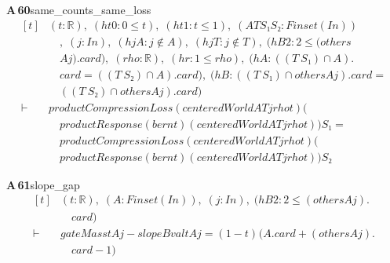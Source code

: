 \documentclass[conference]{IEEEtran}
\theoremstyle{definition}
\newcommand{\lean}[1]{\textsf{\footnotesize #1}}
\begin{document}
\noindent\textbf{A\,60}\quad\lean{same\_counts\_same\_loss}
{\footnotesize\[ \begin{aligned}[t]
&(\mathit{t} : \mathbb{R} ),\; (\mathit{ht0} : 0 \leq \mathit{t}),\; (\mathit{ht1} : \mathit{t} \leq 1),\; (\mathit{A} \mathit{T} \mathit{S₁} \mathit{S₂} : \mathit{Finset} (\mathit{I} \mathit{n}))\\
&\quad ,\; (\mathit{j} : \mathit{I} \mathit{n}),\; (\mathit{hjA} : \mathit{j} \notin \mathit{A}),\; (\mathit{hjT} : \mathit{j} \notin \mathit{T}),\; (\mathit{hB2} : 2 \leq (\mathit{others}\\
&\quad \mathit{A} \mathit{j}).\mathit{card}),\; (\mathit{rho} : \mathbb{R} ),\; (\mathit{hr} : 1 \leq \mathit{rho}),\; (\mathit{hA} : ((\mathit{T} \ \mathit{S₁}) \cap \mathit{A}).\\
&\quad \mathit{card} = ((\mathit{T} \ \mathit{S₂}) \cap \mathit{A}).\mathit{card}),\; (\mathit{hB} : ((\mathit{T} \ \mathit{S₁}) \cap \mathit{others} \mathit{A} \mathit{j}).\mathit{card} =\\
&\quad ((\mathit{T} \ \mathit{S₂}) \cap \mathit{others} \mathit{A} \mathit{j}).\mathit{card})\\
\vdash\;&\mathit{productCompressionLoss} (\mathit{centeredWorld} \mathit{A} \mathit{T} \mathit{j} \mathit{rho} \mathit{t}) (\\
&\quad \mathit{productResponse} (\mathit{bern} \mathit{t}) (\mathit{centeredWorld} \mathit{A} \mathit{T} \mathit{j} \mathit{rho} \mathit{t})) \mathit{S₁} =\\
&\quad \mathit{productCompressionLoss} (\mathit{centeredWorld} \mathit{A} \mathit{T} \mathit{j} \mathit{rho} \mathit{t}) (\\
&\quad \mathit{productResponse} (\mathit{bern} \mathit{t}) (\mathit{centeredWorld} \mathit{A} \mathit{T} \mathit{j} \mathit{rho} \mathit{t})) \mathit{S₂}
\end{aligned} \]}

\noindent\textbf{A\,61}\quad\lean{slope\_gap}
{\footnotesize\[ \begin{aligned}[t]
&(\mathit{t} : \mathbb{R} ),\; (\mathit{A} : \mathit{Finset} (\mathit{I} \mathit{n})),\; (\mathit{j} : \mathit{I} \mathit{n}),\; (\mathit{hB2} : 2 \leq (\mathit{others} \mathit{A} \mathit{j}).\\
&\quad \mathit{card})\\
\vdash\;&\mathit{gateMass} \mathit{t} \mathit{A} \mathit{j}-\mathit{slopeBval} \mathit{t} \mathit{A} \mathit{j} = (1-\mathit{t})^{}(\mathit{A}.\mathit{card}+(\mathit{others} \mathit{A} \mathit{j}).\\
&\quad \mathit{card}-1)
\end{aligned} \]}
\end{document}
